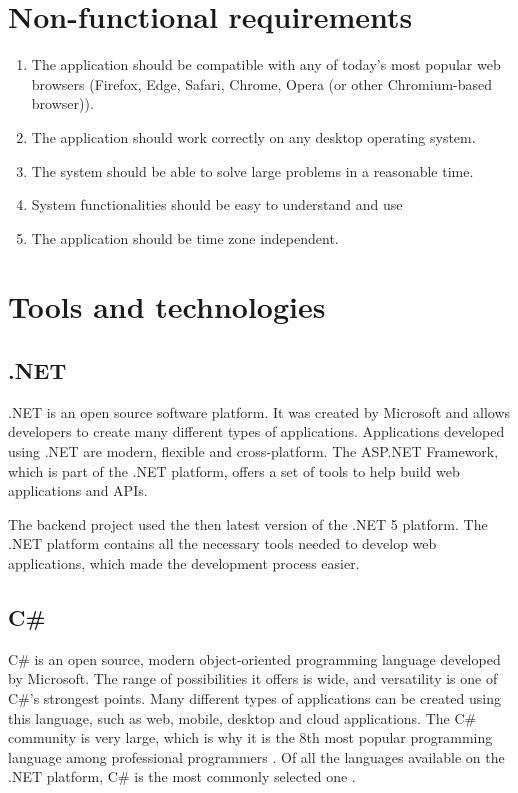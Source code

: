 \documentclass[a4paper,twoside,12pt]{book}
\begin{document}
\section{Non-functional requirements}
\begin{enumerate}
    \item The application should be compatible with any of today's most popular web browsers (Firefox, Edge, Safari, Chrome, Opera (or other Chromium-based browser)).
    \item The application should work correctly on any desktop operating system.
    \item The system should be able to solve large problems in a reasonable time.
    \item System functionalities should be easy to understand and use
    \item The application should be time zone independent.
\end{enumerate}

\section{Tools and technologies}

\subsection{.NET}
.NET is an open source software platform. It was created by Microsoft and allows developers to create many different types of applications. Applications developed using .NET are modern, flexible and cross-platform. The ASP.NET Framework, which is part of the .NET platform, offers a set of tools to help build web applications and APIs.

The backend project used the then latest version of the .NET 5 platform. The .NET platform contains all the necessary tools needed to develop web applications, which made the development process easier.

\subsection{C\#}
C\# is an open source, modern object-oriented programming language developed by Microsoft. The range of possibilities it offers is wide, and versatility is one of C\#'s strongest points. Many different types of applications can be created using this language, such as web, mobile, desktop and cloud applications. The C\# community is very large, which is why it is the 8th most popular programming language among professional programmers \cite{bib:stackSurvey}. Of all the languages available on the .NET platform, C\# is the most commonly selected one \cite{bib:netSurvey}.
\end{document}
